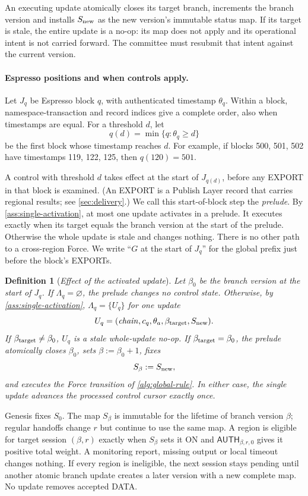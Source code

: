 \documentclass[11pt,a4paper]{article}
\newcommand{\tagg}[1]{\ensuremath{\mathsf{#1}}}
\newcommand{\defterm}[1]{\textcolor{rrBlue}{\textit{#1}}}
\newtheorem{definition}{Definition}[section]
\begin{document}
An executing update atomically closes its target branch, increments the
branch version and installs $S_{\rm new}$ as the new version's immutable
status map.  If its target is stale, the entire update is a no-op: its
map does not apply and its operational intent is not carried forward.
The committee must resubmit that intent against the current version.

\paragraph{Espresso positions and when controls apply.}
Let $J_q$ be Espresso block $q$, with authenticated timestamp $\theta_q$.
Within a block, namespace-transaction and record indices give a complete
order, also when timestamps are equal. For a threshold $d$, let
\[
 q(d)=\min\{q:\theta_q\ge d\}
\]
be the first block whose timestamp reaches $d$. For example, if blocks
500, 501, 502 have timestamps 119, 122, 125, then $q(120)=501$.

A control with threshold $d$ takes effect at the start of $J_{q(d)}$,
before any EXPORT in that block is examined. (An EXPORT is a Publish
Layer record that carries regional results; see \cref{sec:delivery}.) We
call this start-of-block step the \defterm{prelude}. By
\cref{ass:single-activation}, at most one update activates in a prelude.
It executes exactly when its target equals the branch version at the
start of the prelude. Otherwise the whole update is stale and changes
nothing. There is no other path to a cross-region Force. We write ``$G$
at the start of $J_q$'' for the global prefix just before the block's
EXPORTs.

\begin{definition}[\defterm{Effect of the activated update}]
\label{def:control-effect}
Let $\beta_0$ be the branch version at the start of $J_q$. If
$\Lambda_q=\varnothing$, the prelude changes no control state. Otherwise,
by \cref{ass:single-activation}, $\Lambda_q=\{U_q\}$ for one update
\[
 U_q=(\mathit{chain},c_q,\theta_a,\beta_{\rm target},S_{\rm new}).
\]
If $\beta_{\rm target}\ne\beta_0$, $U_q$ is a stale whole-update no-op.
If $\beta_{\rm target}=\beta_0$, the prelude atomically closes $\beta_0$,
sets $\beta:=\beta_0+1$, fixes
\[
 S_{\beta}:=S_{\rm new},
\]
and executes the Force transition of \cref{alg:global-rule}. In either
case, the single update advances the processed control cursor exactly
once.
\end{definition}

Genesis fixes $S_0$.  The map $S_\beta$ is immutable for the lifetime of
branch version $\beta$; regular handoffs change $r$ but continue to use
the same map.  A region is eligible for target session $(\beta,r)$ exactly when
$S_\beta$ sets it ON and $\tagg{AUTH}_{\beta,r,0}$ gives it positive total
weight. A monitoring report, missing output or local timeout changes
nothing.  If every region is ineligible, the next session stays pending
until another atomic branch update creates a later version with a new
complete map.  No update removes accepted DATA.
\end{document}
